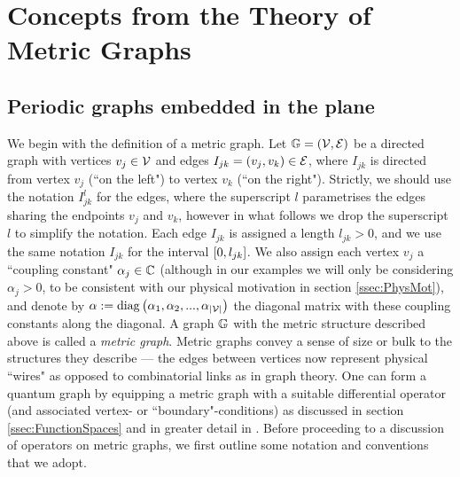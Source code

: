 \section{Concepts from the Theory of Metric Graphs} \label{sec:QuantumGraphs}

\subsection{Periodic graphs embedded in the plane} \label{ssec:EmbeddedGraphs}
We begin with the definition of a metric graph.
Let $\mathbb{G}=\left( \mathcal{V},\mathcal{E} \right)$ be a directed graph with vertices $v_j\in \mathcal{V}$ and edges $I_{jk}=\left( v_j, v_k \right)\in \mathcal{E}$, where $I_{jk}$ is directed from vertex $v_j$ (``on the left") to vertex $v_k$ (``on the right").
Strictly, we should use the notation $I_{jk}^l$ for the edges, where the superscript $l$ parametrises the edges sharing the endpoints $v_j$ and $v_k$, however in what follows we drop the superscript $l$ to simplify the notation.
Each edge $I_{jk}$ is assigned a length $l_{jk}>0$, and we use the same notation $I_{jk}$ for the interval $\left[ 0,l_{jk} \right]$.
We also assign each vertex $v_j$ a ``coupling constant" $\alpha_j\in\mathbb{C}$ (although in our examples we will only be considering $\alpha_j>0$, to be consistent with our physical motivation in section \ref{ssec:PhysMot}), and denote by $\alpha := \mathrm{diag}\left( \alpha_1, \alpha_2, ..., \alpha_{\left\lvert \mathcal{V} \right\rvert} \right)$ the diagonal matrix with these coupling constants along the diagonal.
A graph $\mathbb{G}$ with the metric structure described above is called a \emph{metric graph}.
Metric graphs convey a sense of size or bulk to the structures they describe --- the edges between vertices now represent physical ``wires" as opposed to combinatorial links as in graph theory.
One can form a quantum graph by equipping a metric graph with a suitable differential operator (and associated vertex- or ``boundary"-conditions) as discussed in section \ref{ssec:FunctionSpaces} and in greater detail in \cite{berkolaiko2013introduction}.
Before proceeding to a discussion of operators on metric graphs, we first outline some notation and conventions that we adopt.


